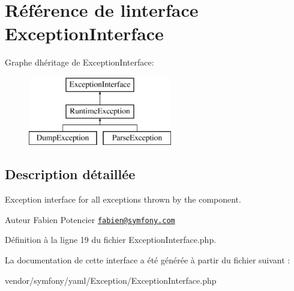 \hypertarget{interface_symfony_1_1_component_1_1_yaml_1_1_exception_1_1_exception_interface}{}\section{Référence de l\textquotesingle{}interface Exception\+Interface}
\label{interface_symfony_1_1_component_1_1_yaml_1_1_exception_1_1_exception_interface}
Graphe d\textquotesingle{}héritage de Exception\+Interface\+:\begin{figure}[H]
\begin{center}
\leavevmode
\includegraphics[height=3.000000cm]{interface_symfony_1_1_component_1_1_yaml_1_1_exception_1_1_exception_interface}
\end{center}
\end{figure}


\subsection{Description détaillée}
Exception interface for all exceptions thrown by the component.

\begin{DoxyAuthor}{Auteur}
Fabien Potencier \href{mailto:fabien@symfony.com}{\tt fabien@symfony.\+com} 
\end{DoxyAuthor}


Définition à la ligne 19 du fichier Exception\+Interface.\+php.



La documentation de cette interface a été générée à partir du fichier suivant \+:\begin{DoxyCompactItemize}
\item 
vendor/symfony/yaml/\+Exception/Exception\+Interface.\+php\end{DoxyCompactItemize}
